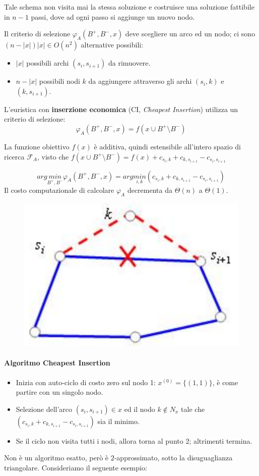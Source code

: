 \documentclass{article}
\begin{document}
    Tale schema non visita mai la stessa soluzione e costruisce una soluzione fattibile in $n-1$ passi,
    dove ad ogni passo si aggiunge un nuovo nodo.

    Il criterio di selezione $\varphi_A(B^+,B^-,x)$ deve scegliere un arco ed un nodo;
    ci sono $(n-|x|)|x|\in O(n^2)$ alternative possibili:
    \begin{itemize}
        \item $|x|$ possibili archi $(s_i,s_{i+1})$ da rimuovere.
        \item $n-|x|$ possibili nodi $k$ da aggiungere attraverso gli archi $(s_i,k)$ e $(k,s_{i+1})$.
    \end{itemize}
    L'euristica con \textbf{inserzione economica} (CI, \textit{Cheapest Insertion}) utilizza un criterio di selezione:
    $$\varphi_A(B^+,B^-,x)=f(x\cup B^+\setminus B^-)$$

    La funzione obiettivo $f(x)$ è additiva, quindi estensibile all'intero spazio di ricerca $\mathcal{F}_A$,
    visto che $f(x\cup B^+\setminus B^-)=f(x)+c_{s_i,k}+c_{k,s_{i+1}}-c_{s_i,s_{i+1}}$

    $$arg\underset{B^+,B^-}{min}\varphi_A(B^+,B^-,x)=arg \underset{i,k}{ min}(c_{s_i,k}+c_{k,s_{i+1}}-c_{s_i,s_{i+1}})$$
    Il costo computazionale di calcolare $\varphi_A$ decrementa da $\Theta(n)$ a $\Theta(1)$.
    \begin{figure}[H]
        \centering
        \includegraphics[scale=0.5]{images/thtsf.png}
    \end{figure}
    \paragraph{Algoritmo Cheapest Insertion}
    \begin{itemize}
        \item Inizia con auto-ciclo di costo zero sul nodo 1: $x^{(0)}=\{(1,1)\}$,
              è come partire con un singolo nodo.
        \item Selezione dell'arco $(s_i,s_{i+1})\in x$ ed il nodo $k\notin N_x$ tale che
              $(c_{s_i,k}+c_{k,s_{i+1}}-c_{s_i,s_{i+1}})$ sia il minimo.
        \item Se il ciclo non visita tutti i nodi, allora torna al punto 2; altrimenti termina.
    \end{itemize}
    Non è un algoritmo esatto, però è $2$-approssimato, sotto la disuguaglianza triangolare. Consideriamo
    il seguente esempio:
\end{document}
